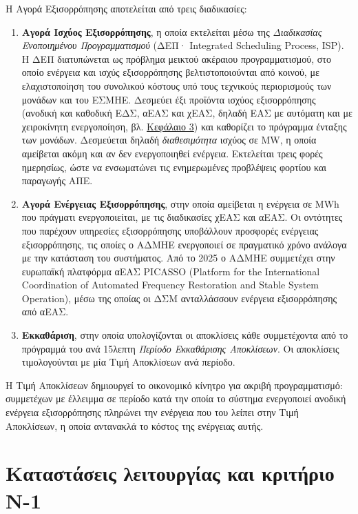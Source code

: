 

Η Αγορά Εξισορρόπησης αποτελείται από τρεις διαδικασίες:

\begin{enumerate}
\item \textbf{Αγορά Ισχύος Εξισορρόπησης}, η οποία εκτελείται μέσω της \emph{Διαδικασίας
      Ενοποιημένου Προγραμματισμού} (ΔΕΠ· Integrated Scheduling Process, ISP). Η ΔΕΠ
      διατυπώνεται ως πρόβλημα μεικτού ακέραιου προγραμματισμού, στο οποίο ενέργεια και ισχύς
      εξισορρόπησης βελτιστοποιούνται από κοινού, με ελαχιστοποίηση του συνολικού κόστους υπό
      τους τεχνικούς περιορισμούς των μονάδων και του ΕΣΜΗΕ. Δεσμεύει έξι προϊόντα ισχύος
      εξισορρόπησης (ανοδική και καθοδική ΕΔΣ, αΕΑΣ και χΕΑΣ, δηλαδή ΕΑΣ με αυτόματη και με
      χειροκίνητη ενεργοποίηση, βλ. \hyperref[kef-03-theoria]{Κεφάλαιο 3}) και καθορίζει το
      πρόγραμμα ένταξης των μονάδων. Δεσμεύεται δηλαδή \emph{διαθεσιμότητα} ισχύος σε MW, η
      οποία αμείβεται ακόμη και αν δεν ενεργοποιηθεί ενέργεια.
      Εκτελείται τρεις φορές ημερησίως, ώστε να ενσωματώνει τις ενημερωμένες προβλέψεις
      φορτίου και παραγωγής ΑΠΕ.
\item \textbf{Αγορά Ενέργειας Εξισορρόπησης}, στην οποία αμείβεται η ενέργεια σε MWh που
      πράγματι ενεργοποιείται, με τις διαδικασίες χΕΑΣ και αΕΑΣ. Οι οντότητες που παρέχουν υπηρεσίες εξισορρόπησης υποβάλλουν προσφορές ενέργειας εξισορρόπησης, τις
      οποίες ο ΑΔΜΗΕ ενεργοποιεί σε πραγματικό χρόνο ανάλογα με την κατάσταση του συστήματος.
      Από το 2025 ο ΑΔΜΗΕ συμμετέχει στην ευρωπαϊκή πλατφόρμα αΕΑΣ PICASSO (Platform for the
      International Coordination of Automated Frequency Restoration and Stable System
      Operation), μέσω της οποίας οι ΔΣΜ ανταλλάσσουν ενέργεια εξισορρόπησης από αΕΑΣ.
\item \textbf{Εκκαθάριση}, στην οποία υπολογίζονται οι αποκλίσεις κάθε συμμετέχοντα από το
      πρόγραμμά του ανά 15λεπτη \emph{Περίοδο Εκκαθάρισης Αποκλίσεων}. Οι αποκλίσεις
      τιμολογούνται με μία Τιμή Αποκλίσεων ανά περίοδο.
\end{enumerate}

Η Τιμή Αποκλίσεων δημιουργεί το οικονομικό κίνητρο για ακριβή προγραμματισμό: συμμετέχων με
έλλειμμα σε περίοδο κατά την οποία το σύστημα ενεργοποιεί ανοδική ενέργεια εξισορρόπησης
πληρώνει την ενέργεια που του λείπει στην Τιμή Αποκλίσεων, η οποία αντανακλά το κόστος της
ενέργειας αυτής. 


\section{Καταστάσεις λειτουργίας και κριτήριο N-1}
\label{sec:states}

